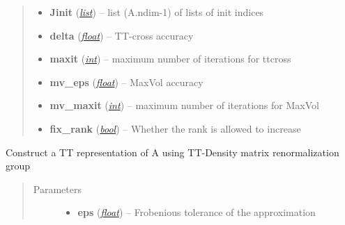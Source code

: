 \documentclass[a4paper,10pt,english]{sphinxmanual}
\begin{document}
\begin{fulllineitems}
\begin{fulllineitems}
\begin{quote}
\begin{description}
\begin{itemize}
\item {} 
\textbf{Jinit} (\href{http://docs.python.org/library/functions.html\#list}{\emph{list}}) -- list (A.ndim-1) of lists of init indices

\item {} 
\textbf{delta} (\href{http://docs.python.org/library/functions.html\#float}{\emph{float}}) -- TT-cross accuracy

\item {} 
\textbf{maxit} (\href{http://docs.python.org/library/functions.html\#int}{\emph{int}}) -- maximum number of iterations for ttcross

\item {} 
\textbf{mv\_eps} (\href{http://docs.python.org/library/functions.html\#float}{\emph{float}}) -- MaxVol accuracy

\item {} 
\textbf{mv\_maxit} (\href{http://docs.python.org/library/functions.html\#int}{\emph{int}}) -- maximum number of iterations for MaxVol

\item {} 
\textbf{fix\_rank} (\href{http://docs.python.org/library/functions.html\#bool}{\emph{bool}}) -- Whether the rank is allowed to increase

\end{itemize}

\end{description}\end{quote}

\end{fulllineitems}


\begin{fulllineitems}
\label{api-ttvec:TensorToolbox.core.TTvec.ttdmrg}
Construct a TT representation of A using TT-Density matrix renormalization group
\begin{quote}\begin{description}
\item[{Parameters}] \leavevmode\begin{itemize}
\item {} 
\textbf{eps} (\href{http://docs.python.org/library/functions.html\#float}{\emph{float}}) -- Frobenious tolerance of the approximation


\end{itemize}
\end{description}
\end{quote}
\end{fulllineitems}
\end{fulllineitems}
\end{document}
